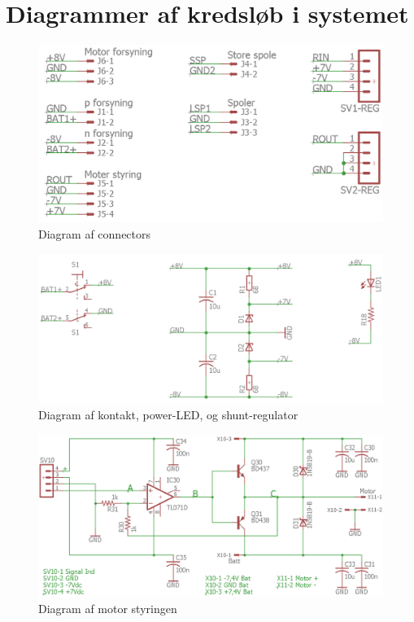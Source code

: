 \clearpage \newpage 
\section{Diagrammer af kredsløb i systemet} \label{bilag:diagrammer}
\begin{figure}[h!]
	\centering
	\includegraphics[width=.6\textwidth]{billeder/sch3_connectors.png}
	\caption{Diagram af connectors}
	\label{dig:sch3_connector}
\end{figure}
\begin{figure}[h!]
	\centering
	\includegraphics[width=.8\textwidth]{billeder/sch2_power_sw.png}
	\caption{Diagram af kontakt, power-LED, og shunt-regulator}
	\label{dig:power_sw}
\end{figure}
\begin{figure}[h!]
	\centering
	\includegraphics[width=1\textwidth]{billeder/motor_cont_schematic.png}
	\caption{Diagram af motor styringen}
	\label{dig:motor_diagram}
\end{figure}
